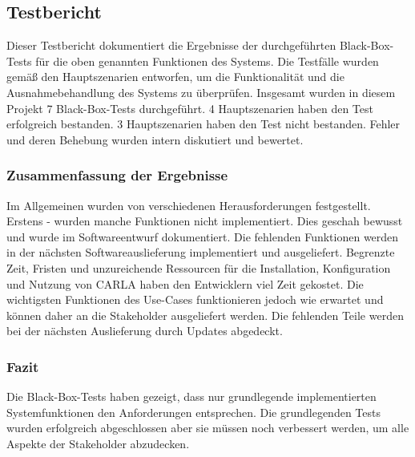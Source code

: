 \subsection{Testbericht}
Dieser Testbericht dokumentiert die Ergebnisse der durchgeführten Black-Box-Tests für die oben genannten Funktionen des Systems. Die Testfälle wurden gemäß den Hauptszenarien entworfen, um die Funktionalität und die Ausnahmebehandlung des Systems zu überprüfen. Insgesamt wurden in diesem Projekt 7 Black-Box-Tests durchgeführt. 4 Hauptszenarien haben den Test erfolgreich bestanden. 3 Hauptszenarien haben den Test nicht bestanden. Fehler und deren Behebung wurden intern diskutiert und bewertet.
\subsubsection{Zusammenfassung der Ergebnisse}
Im Allgemeinen wurden von verschiedenen Herausforderungen festgestellt. Erstens - wurden manche Funktionen nicht implementiert. Dies geschah bewusst und wurde im Softwareentwurf dokumentiert. Die fehlenden Funktionen werden in der nächsten Softwareauslieferung implementiert und ausgeliefert. Begrenzte Zeit, Fristen und unzureichende Ressourcen für die Installation, Konfiguration und Nutzung von CARLA haben den Entwicklern viel Zeit gekostet. Die wichtigsten Funktionen des Use-Cases funktionieren jedoch wie erwartet und können daher an die Stakeholder ausgeliefert werden. Die fehlenden Teile werden bei der nächsten Auslieferung durch Updates abgedeckt.
\subsubsection{Fazit}
Die Black-Box-Tests haben gezeigt, dass nur grundlegende implementierten Systemfunktionen den Anforderungen entsprechen. Die grundlegenden Tests wurden erfolgreich abgeschlossen aber sie müssen noch verbessert werden, um alle Aspekte der Stakeholder abzudecken.